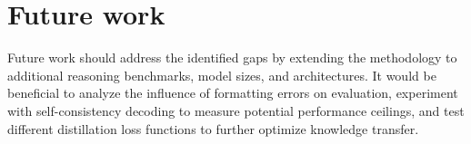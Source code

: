 \section{Future work}
Future work should address the identified gaps by extending the methodology to additional reasoning benchmarks, model sizes, and architectures. It would be beneficial to analyze the influence of formatting errors on evaluation, experiment with self-consistency decoding to measure potential performance ceilings, and test different distillation loss functions to further optimize knowledge transfer.
